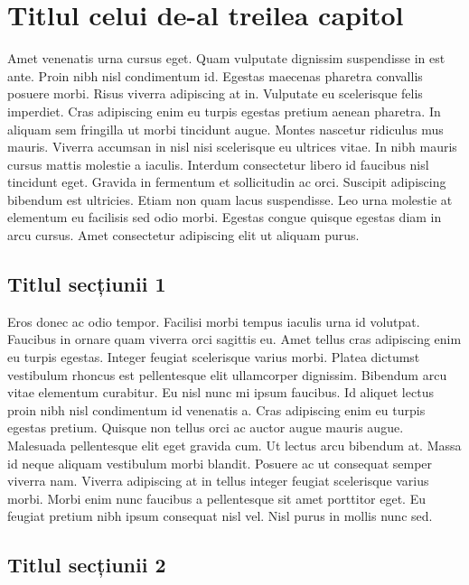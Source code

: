 \chapter{Titlul celui de-al treilea capitol}

Amet venenatis urna cursus eget. Quam vulputate dignissim suspendisse in est ante. Proin nibh nisl condimentum id. Egestas maecenas pharetra convallis posuere morbi. Risus viverra adipiscing at in. Vulputate eu scelerisque felis imperdiet. Cras adipiscing enim eu turpis egestas pretium aenean pharetra. In aliquam sem fringilla ut morbi tincidunt augue. Montes nascetur ridiculus mus mauris. Viverra accumsan in nisl nisi scelerisque eu ultrices vitae. In nibh mauris cursus mattis molestie a iaculis. Interdum consectetur libero id faucibus nisl tincidunt eget. Gravida in fermentum et sollicitudin ac orci. Suscipit adipiscing bibendum est ultricies. Etiam non quam lacus suspendisse. Leo urna molestie at elementum eu facilisis sed odio morbi. Egestas congue quisque egestas diam in arcu cursus. Amet consectetur adipiscing elit ut aliquam purus.

\section{Titlul secțiunii 1}

Eros donec ac odio tempor. Facilisi morbi tempus iaculis urna id volutpat. Faucibus in ornare quam viverra orci sagittis eu. Amet tellus cras adipiscing enim eu turpis egestas. Integer feugiat scelerisque varius morbi. Platea dictumst vestibulum rhoncus est pellentesque elit ullamcorper dignissim. Bibendum arcu vitae elementum curabitur. Eu nisl nunc mi ipsum faucibus. Id aliquet lectus proin nibh nisl condimentum id venenatis a. Cras adipiscing enim eu turpis egestas pretium. Quisque non tellus orci ac auctor augue mauris augue. Malesuada pellentesque elit eget gravida cum. Ut lectus arcu bibendum at. Massa id neque aliquam vestibulum morbi blandit. Posuere ac ut consequat semper viverra nam. Viverra adipiscing at in tellus integer feugiat scelerisque varius morbi. Morbi enim nunc faucibus a pellentesque sit amet porttitor eget. Eu feugiat pretium nibh ipsum consequat nisl vel. Nisl purus in mollis nunc sed.

\section{Titlul secțiunii 2}

